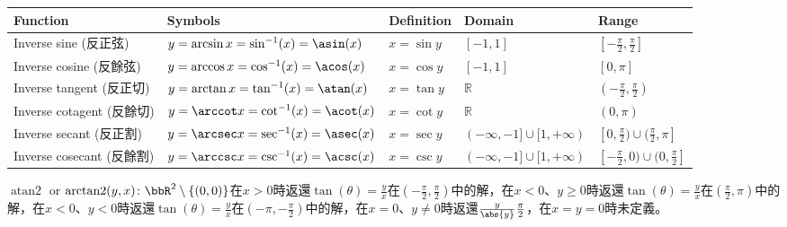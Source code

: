 \documentclass[a4paper,12pt]{report}
\begin{document}
\begin{longtable}[c]{|p{}|p{}|p{}|p{}|p{}|}
\hline
Function & Symbols & Definition & Domain & Range \\ 
\hline\endhead
    Inverse sine (反正弦) & \(y=\arcsin x=\sin^{-1}(x)=\asin(x)\) & \(x=\sin y\) & \([-1,1]\) & \([-\frac{\pi}{2},\frac{\pi}{2}]\) \\ \hline
    Inverse cosine (反餘弦) & \(y=\arccos x=\cos^{-1}(x)=\acos(x)\) & \(x=\cos y\) & \([-1,1]\) & \([0,\pi]\) \\ \hline
    Inverse tangent (反正切) & \(y=\arctan x=\tan^{-1}(x)=\atan(x)\) & \(x=\tan y\) & \(\mathbb{R}\) & \((-\frac{\pi}{2},\frac{\pi}{2})\) \\ \hline
    Inverse cotagent (反餘切) & \(y=\arccot x=\cot^{-1}(x)=\acot(x)\) & \(x=\cot y\) & \(\mathbb{R}\) & \((0,\pi)\) \\ \hline
    Inverse secant (反正割) & \(y=\arcsec x=\sec^{-1}(x)=\asec(x)\) & \(x=\sec y\) & \((-\infty,-1]\cup[1,+\infty)\) & \([0,\frac{\pi}{2})\cup(\frac{\pi}{2},\pi]\) \\ \hline
    Inverse cosecant (反餘割) & \(y=\arccsc x=\csc^{-1}(x)=\acsc(x)\) & \(x=\csc y\) & \((-\infty,-1]\cup[1,+\infty)\) & \([-\frac{\pi}{2},0)\cup(0,\frac{\pi}{2}]\) \\ \hline
\end{longtable}
\FB
{}
$\operatorname{atan2}$ or $\operatorname{arctan2}(y,x)\colon\bbR^2\setminus\{(0,0)\}$在$x>0$時返還$\tan(\theta)=\frac{y}{x}$在$(-\frac{\pi}{2},\frac{\pi}{2})$中的解，在$x<0$、$y\geq 0$時返還$\tan(\theta)=\frac{y}{x}$在$(\frac{\pi}{2},\pi)$中的解，在$x<0$、$y<0$時返還$\tan(\theta)=\frac{y}{x}$在$(-\pi,-\frac{\pi}{2})$中的解，在$x=0$、$y\neq 0$時返還$\frac{y}{\abs{y}}\frac{\pi}{2}$，在$x=y=0$時未定義。
\end{document}
